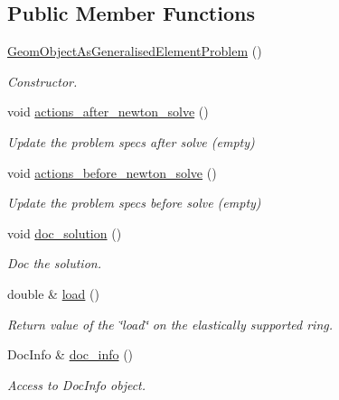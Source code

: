 \subsection*{Public Member Functions}
\begin{DoxyCompactItemize}
\item 
\hyperlink{classGeomObjectAsGeneralisedElementProblem_ad1f15fcb6c055c58d1f71b522f1f7bd6}{Geom\+Object\+As\+Generalised\+Element\+Problem} ()
\begin{DoxyCompactList}\small\item\em Constructor. \end{DoxyCompactList}\item 
void \hyperlink{classGeomObjectAsGeneralisedElementProblem_af396d1789e2552c43e0c68561d88d473}{actions\+\_\+after\+\_\+newton\+\_\+solve} ()
\begin{DoxyCompactList}\small\item\em Update the problem specs after solve (empty) \end{DoxyCompactList}\item 
void \hyperlink{classGeomObjectAsGeneralisedElementProblem_a4ae01862ddbbeeacca1ce7a444e28931}{actions\+\_\+before\+\_\+newton\+\_\+solve} ()
\begin{DoxyCompactList}\small\item\em Update the problem specs before solve (empty) \end{DoxyCompactList}\item 
void \hyperlink{classGeomObjectAsGeneralisedElementProblem_a5092be8e6172d6c9147115bdd485db35}{doc\+\_\+solution} ()
\begin{DoxyCompactList}\small\item\em Doc the solution. \end{DoxyCompactList}\item 
double \& \hyperlink{classGeomObjectAsGeneralisedElementProblem_a5ae799de23742e4c8fa54ee7ae32e679}{load} ()
\begin{DoxyCompactList}\small\item\em Return value of the \char`\"{}load\char`\"{} on the elastically supported ring. \end{DoxyCompactList}\item 
Doc\+Info \& \hyperlink{classGeomObjectAsGeneralisedElementProblem_a4be869d81c0df187d4239a590826f139}{doc\+\_\+info} ()
\begin{DoxyCompactList}\small\item\em Access to Doc\+Info object. \end{DoxyCompactList}\end{DoxyCompactItemize}
